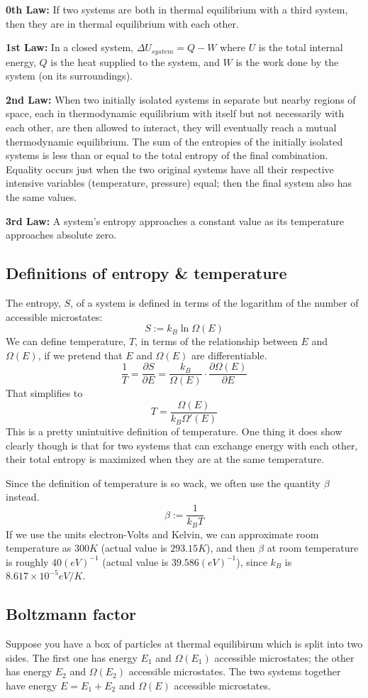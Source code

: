 \documentclass[12pt]{article}
\begin{document}
\textbf{0th Law:} If two systems are both in thermal equilibrium with a third system, then they are in thermal equilibrium with each other.

\textbf{1st Law:} In a closed system, $\Delta U_{system} = Q - W$ where $U$ is the total internal energy, $Q$ is the heat supplied to the system, and $W$ is the work done by the system (on its surroundings).

\textbf{2nd Law:} When two initially isolated systems in separate but nearby regions of space, each in thermodynamic equilibrium with itself but not necessarily with each other, are then allowed to interact, they will eventually reach a mutual thermodynamic equilibrium. The sum of the entropies of the initially isolated systems is less than or equal to the total entropy of the final combination. Equality occurs just when the two original systems have all their respective intensive variables (temperature, pressure) equal; then the final system also has the same values.

\textbf{3rd Law:} A system's entropy approaches a constant value as its temperature approaches absolute zero.

\subsection{Definitions of entropy \& temperature}
The entropy, $S$, of a system is defined in terms of the logarithm of the number of accessible microstates:
\[S := k_B \ln{\Omega(E)}\]
We can define temperature, $T$, in terms of the relationship between $E$ and $\Omega(E)$, if we pretend that $E$ and $\Omega(E)$ are differentiable.
\[\frac{1}{T} = \frac{\partial S}{\partial E} = \frac{k_B}{\Omega(E)} \cdot \frac{\partial \Omega(E)}{\partial E}\]
That simplifies to
\[T = \frac{\Omega(E)}{k_B \Omega'(E)}\]
This is a pretty unintuitive definition of temperature. One thing it does show clearly though is that for two systems that can exchange energy with each other, their total entropy is maximized when they are at the same temperature.

Since the definition of temperature is so wack, we often use the quantity $\beta$ instead.
\[\beta := \frac{1}{k_B T} \]
If we use the units electron-Volts and Kelvin, we can approximate room temperature as $300K$ (actual value is $293.15K$), and then $\beta$ at room temperature is roughly $40 (eV)^{-1}$ (actual value is $39.586 (eV)^{-1}$), since $k_B$ is $8.617 \times 10^{-5} eV/K$.

\subsection{Boltzmann factor}
Suppose you have a box of particles at thermal equilibirum which is split into two sides. The first one has energy $E_1$ and $\Omega(E_1)$ accessible microstates; the other has energy $E_2$ and $\Omega(E_2)$ accessible microstates. The two systems together have energy $E = E_1 + E_2$ and $\Omega(E)$ accessible microstates.
\end{document}
